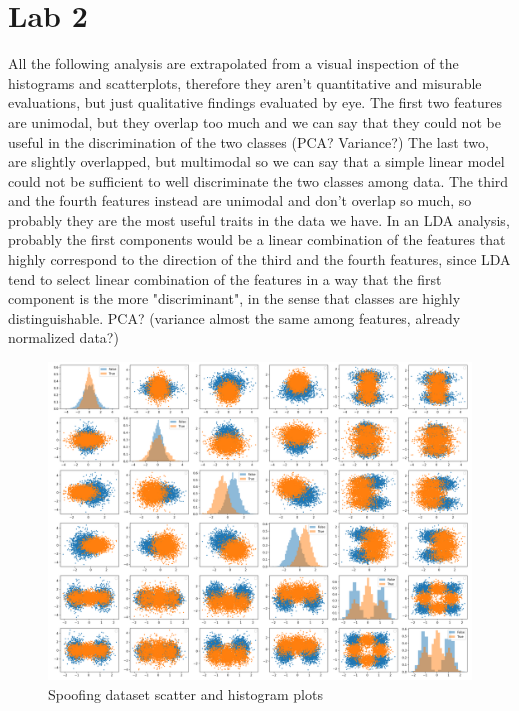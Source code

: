 
\section{Lab 2}

All the following analysis are extrapolated from a visual inspection of the
histograms and scatterplots, therefore they aren't quantitative and misurable
evaluations, but just qualitative findings evaluated by eye.
The first two features are unimodal, but they overlap too much and we can say
that they could not be useful in the discrimination of the two classes (PCA? Variance?)
The last two, are slightly overlapped, but multimodal so we can say that a simple linear
model could not be sufficient to well discriminate the two classes among data.
The third and the fourth features instead are unimodal and don't overlap so much,
so probably they are the most useful traits in the data we have. In an LDA analysis,
probably the first components would be a linear combination of the features that
highly correspond to the direction of the third and the fourth features, since LDA
tend to select linear combination of the features in a way that the first component
is the more "discriminant", in the sense that classes are highly distinguishable.
PCA? (variance almost the same among features, already normalized data?)

\begin{figure}[htbp]
    \centering
    \includegraphics[width=0.9\linewidth]{lab02/scatter.png} %
    \caption{Spoofing dataset scatter and histogram plots}
    \label{fig:scatter}
\end{figure}